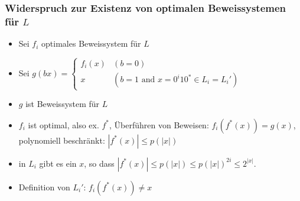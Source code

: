 \begin{frame}
  \frametitle{Widerspruch zur Existenz von optimalen Beweissystemen für \(L\)}

  \begin{itemize}
   \item<1-> Sei \(f_i\) optimales Beweissystem für \(L\)
   \item<2-> Sei
         \(g(bx) =
           \begin{cases}
             f_i(x) & (b=0) \\
             x      & (b = 1 \text{ and } x=0^i10^* \in L_i = L_i') 
           \end{cases}\)
   \item<3-> \(g\) ist Beweissystem für \(L\)
   \item<4-> \(f_i\) ist optimal, also ex. \(f^*\), Überführen von Beweisen: \(f_i(f^*(x)) = g(x)\), polynomiell beschränkt: \(|f^*(x)| \leq p(|x|)\)
   \item<5-> in \(L_i\) gibt es ein \(x\), so dass \(|f^*(x)| \leq p(|x|) \leq p(|x|)^{2i} \leq 2^{|x|}\).
   \item<6-> Definition von \(L_i'\): \(f_i(f^*(x)) \neq x\)
  \end{itemize}

\end{frame}

